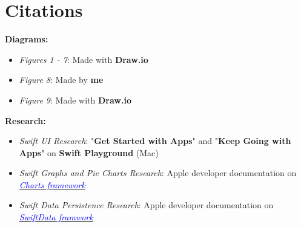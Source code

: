 \documentclass{article}
\newcommand{\jumpTo}[1]{\textcolor{blue}{#1}}
\begin{document}
\section{Citations}
\textbf{Diagrams:}
\begin{itemize}
    \item \textit{Figures 1 - 7}: Made with \textbf{Draw.io}
    \item \textit{Figure 8}: Made by \textbf{me}
    \item \textit{Figure 9}: Made with \textbf{Draw.io}
\end{itemize}
\textbf{Research:}
\begin{itemize}
    \item \textit{Swift UI Research}: "\textbf{Get Started with Apps}" and "\textbf{Keep Going with Apps}" on \textbf{Swift Playground} (Mac)
    \item \textit{Swift Graphs and Pie Charts Research}: Apple developer documentation on \href{https://developer.apple.com/documentation/charts}{\jumpTo{\textit{Charts framework}}}
    \item \textit{Swift Data Persistence Research}: Apple developer documentation on \href{https://developer.apple.com/documentation/swiftdata}{\jumpTo{\textit{SwiftData framwork}}}
\end{itemize}
\end{document}
